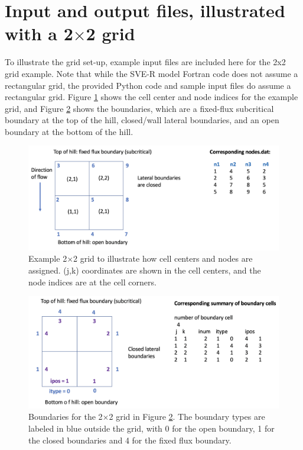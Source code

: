 \documentclass{article}
\newcommand{\code}[1]{\texttt{#1}}
\begin{document}
\section{Input and output files, illustrated with a 2$\times$2 grid}



%	
	 

To illustrate the grid set-up, example input files are included here for the 2x2 grid example.  Note that while the SVE-R model Fortran code does not assume a  rectangular grid, the provided Python code and sample input files do assume a rectangular grid. 
 Figure \ref{2by2} shows the cell center and node indices for the example grid, and Figure \ref{2by2boundary} shows the boundaries, which are a fixed-flux subcritical boundary at the top of the hill, closed/wall lateral boundaries, and an open boundary at the bottom of the hill.


 \begin{figure}[h]
 \centering
\includegraphics[width=30pc]{grid/2by2nodes.png}
 \caption{Example 2$\times$2 grid to illustrate how cell centers and nodes are assigned.  (j,k) coordinates are shown in the cell centers, and the node indices are at the cell corners. }
 \label{2by2}
 \end{figure}
 
 \begin{figure}[h]
 \centering
\includegraphics[width=30pc]{grid/2by2boundary.png}
 \caption{Boundaries for the 2$\times$2 grid in Figure \ref{2by2boundary}. The boundary types are labeled in blue outside the grid, with 0 for the open boundary, 1 for the closed boundaries and 4 for the fixed flux boundary.  }
 \label{2by2boundary}
 \end{figure}
 
\end{document}
